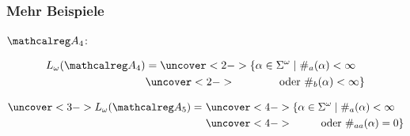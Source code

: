     \begin{frame}
      \frametitle{Mehr Beispiele}

      \begin{exampleblock}{}
        \begin{small}
          $\Aut{A}_4$: 
          \hfill
          \begin{minipage}[t]{.54\textwidth}
            \vspace*{-1.6\baselineskip}
            \begin{align*}
              L_\omega(\Aut{A}_4) & = \uncover<2->{\{\alpha\in\Sigma^\omega \mid \#_{a}(\alpha) < \infty} \\
                                  & \uncover<2->{\qquad\qquad \text{oder } \#_b(\alpha) < \infty\}}
            \end{align*}
          \end{minipage}

          \par\bigskip
          \hfill
          \begin{minipage}[t]{.54\textwidth}
            \vspace*{-1.6\baselineskip}
            \begin{align*}
              \uncover<3->{L_\omega(\Aut{A}_5) =}~ & \uncover<4->{\{\alpha\in\Sigma^\omega \mid \#_{a}(\alpha) < \infty} \\
                                                   & \uncover<4->{\qquad~~ \text{oder } \#_{aa}(\alpha) = 0\}}
            \end{align*}

          \end{minipage}


\end{small}
\end{exampleblock}
\end{frame}
